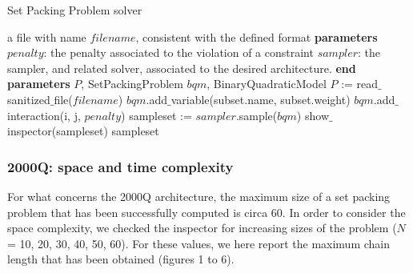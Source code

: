 \documentclass[oneside,a4paper]{article}
\begin{document}
\begin{algorithm}
\caption{Set Packing Problem solver}
\begin{algorithmic}[1]
\Require a file with name $filename$, consistent with the defined format
\State \textbf{parameters}
\Indent
    \State $penalty$: the penalty associated to the violation of a constraint
    \State $sampler$: the sampler, and related solver, associated to the desired architecture.
\EndIndent
\State \textbf{end parameters}
\Variables
 \State $P$, SetPackingProblem
 \State $bqm$, BinaryQuadraticModel
\EndVariables
\State $P$ := read$\_$sanitized$\_$file($filename$)  
        \State $bqm$.add$\_$variable(subset.name, subset.weight)   
\EndFor  \label{loop2}
            \State $bqm$.add$\_$interaction(i, j, $penalty$)   
        \EndFor
    \EndFor
\EndFor  \label{loop3}
\State sampleset := $sampler$.sample($bqm$) 
\State show$\_$inspector(sampleset) 
\State \Return sampleset 
\EndProcedure
\end{algorithmic}
\end{algorithm}
\newpage
\subsubsection{2000Q: space and time complexity} 

For what concerns the 2000Q architecture, the maximum size of a set packing problem that has been successfully computed is circa 60. In order to consider the space complexity, we checked the inspector for increasing sizes of the problem ($N$ = 10, 20, 30, 40, 50, 60). For these values, we here report the maximum chain length that has been obtained (figures 1 to 6).
\end{document}
